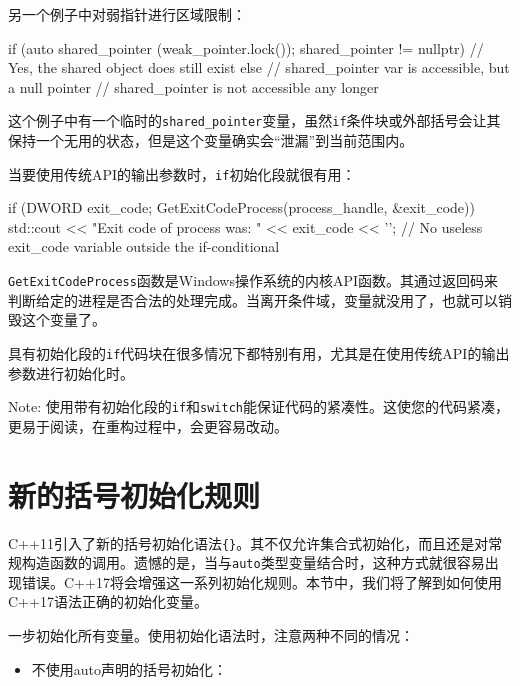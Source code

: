 另一个例子中对弱指针进行区域限制：

\begin{codebox}[cpp]
if (auto shared_pointer (weak_pointer.lock()); shared_pointer != nullptr) {
  // Yes, the shared object does still exist
} else {
  // shared_pointer var is accessible, but a null pointer
}
// shared_pointer is not accessible any longer
\end{codebox}

这个例子中有一个临时的\texttt{shared\_pointer}变量，虽然\texttt{if}条件块或外部括号会让其保持一个无用的状态，但是这个变量确实会“泄漏”到当前范围内。

当要使用传统API的输出参数时，\texttt{if}初始化段就很有用：

\begin{codebox}[cpp]
if (DWORD exit_code; GetExitCodeProcess(process_handle, &exit_code)) {
  std::cout << "Exit code of process was: " << exit_code << '\n';
}
// No useless exit_code variable outside the if-conditional
\end{codebox}

\texttt{GetExitCodeProcess}函数是Windows操作系统的内核API函数。其通过返回码来判断给定的进程是否合法的处理完成。当离开条件域，变量就没用了，也就可以销毁这个变量了。

具有初始化段的\texttt{if}代码块在很多情况下都特别有用，尤其是在使用传统API的输出参数进行初始化时。

\begin{myInfoBox}
Note: 使用带有初始化段的\texttt{if}和\texttt{switch}能保证代码的紧凑性。这使您的代码紧凑，更易于阅读，在重构过程中，会更容易改动。
\end{myInfoBox}


\section{新的括号初始化规则}

C++11引入了新的括号初始化语法\texttt{\{\}}。其不仅允许集合式初始化，而且还是对常规构造函数的调用。遗憾的是，当与\texttt{auto}类型变量结合时，这种方式就很容易出现错误。C++17将会增强这一系列初始化规则。本节中，我们将了解到如何使用C++17语法正确的初始化变量。


一步初始化所有变量。使用初始化语法时，注意两种不同的情况：

\begin{itemize}
\item 不使用auto声明的括号初始化：

\end{itemize}

